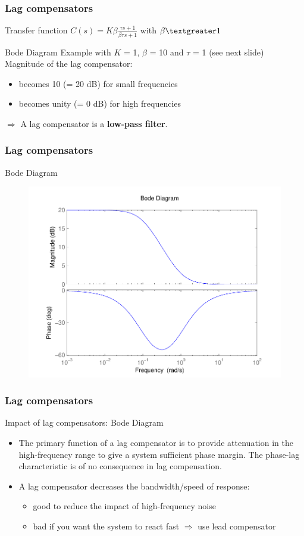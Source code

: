 \begin{frame}
	\frametitle{Lag compensators}
	\begin{block}{Transfer function}
		$C(s) = K\beta\frac{\tau s + 1}{\beta \tau s + 1}$ with $\beta  \textgreater  1$
	\end{block}
	\begin{block}{Bode Diagram}
		Example with $K$ = 1, $\beta$ = 10 and $\tau$ = 1 (see next slide) \\ 
		Magnitude of the lag compensator: 
		\begin{itemize}
			\item becomes 10 (= 20 dB) for small frequencies
			\item becomes unity (= 0 dB) for high frequencies
		\end{itemize}
		$\Rightarrow$ A lag compensator is a {\bf low-pass filter}.
		
	\end{block}
\end{frame}

\begin{frame}
\frametitle{Lag compensators}
\begin{block}{Bode Diagram}
	\begin{figure}
		\centering
		\includegraphics[width=0.5
		\linewidth]{bodelagislowpass}
	\end{figure}
\end{block}
\end{frame}

\begin{frame}
	\frametitle{Lag compensators}
	\begin{block}{Impact of lag compensators: Bode Diagram}
	\begin{itemize}
	\item The primary function of a lag compensator is to provide attenuation in the high-frequency
	range to give a system sufficient phase margin. The phase-lag characteristic
	is of no consequence in lag compensation.
	\item A lag compensator decreases the bandwidth/speed of response: 
	\begin{itemize}
		\item good to reduce the impact of high-frequency noise 
		\item bad if you want the system to react fast $\Rightarrow$ use lead compensator
	\end{itemize}
	\end{itemize}
	\end{block}
\end{frame}

